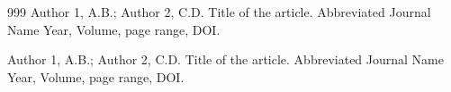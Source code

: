 \documentclass{article}
\begin{document}


%



\begin{thebibliography}{999}
Author 1, A.B.; Author 2, C.D. Title of the article. Abbreviated Journal Name Year, Volume, page range, DOI.

Author 1, A.B.; Author 2, C.D. Title of the article. Abbreviated Journal Name Year, Volume, page range, DOI.

\end{thebibliography}


%


\end{document}
